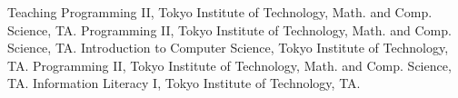 \begin{rubric}{Teaching}
  \entry*[2020] Programming II, Tokyo Institute of Technology, Math. and
  Comp. Science, TA.
  \entry*[2019] Programming II, Tokyo Institute of Technology, Math. and
  Comp. Science, TA.
  \entry*[2019] Introduction to Computer Science, Tokyo Institute of Technology, TA.
  \entry*[2018] Programming II, Tokyo Institute of Technology, Math. and
  Comp. Science, TA.
  \entry*[2018] Information Literacy I, Tokyo Institute of Technology, TA.
\end{rubric}